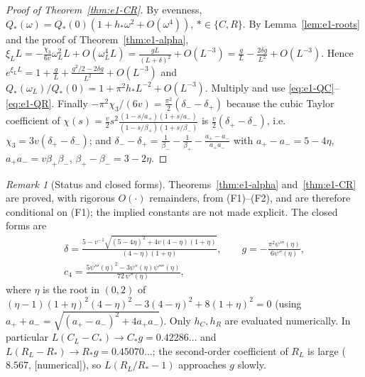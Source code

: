 \documentclass[11pt,a4paper]{article}
\theoremstyle{definition}
\theoremstyle{remark}
\newtheorem{remark}[theorem]{Remark}
\newcommand{\1}{\mathbf 1}
\newcommand{\status}[1]{\textsf{[#1]}}
\begin{document}
\begin{proof}[Proof of Theorem~\ref{thm:e1-CR}]
By evenness, $Q_\ast(\omega)=Q_\ast(0)(1+h_\ast\omega^2+O(\omega^4))$, $\ast\in\{C,R\}$. By
Lemma~\ref{lem:e1-roots} and the proof of Theorem~\ref{thm:e1-alpha},
$\xi_LL=-\frac{\chi_3}{6v}\omega_L^2L+O(\omega_L^4L)=\frac{gL}{(L+\delta)^2}+O(L^{-3})
=\frac gL-\frac{2\delta g}{L^2}+O(L^{-3})$. Hence
$e^{\xi_LL}=1+\frac gL+\frac{g^2/2-2\delta g}{L^2}+O(L^{-3})$ and
$Q_\ast(\omega_L)/Q_\ast(0)=1+\pi^2h_\ast L^{-2}+O(L^{-3})$. Multiply and use
\eqref{eq:e1-QC}--\eqref{eq:e1-QR}. Finally
$-\pi^2\chi_3/(6v)=\frac{\pi^2}2(\delta_--\delta_+)$ because the cubic Taylor coefficient of
$\chi(s)=\frac v2s^2\frac{(1-s/a_+)(1+s/a_-)}{(1-s/\beta_+)(1+s/\beta_-)}$ is
$\frac v2(\delta_+-\delta_-)$, i.e.\ $\chi_3=3v(\delta_+-\delta_-)$; and
$\delta_--\delta_+=\frac1{\beta_-}-\frac1{\beta_+}-\frac{a_+-a_-}{a_+a_-}$ with $a_+-a_-=5-4\eta$,
$a_+a_-=v\beta_+\beta_-$, $\beta_+-\beta_-=3-2\eta$.
\end{proof}

\begin{remark}[Status and closed forms]
Theorems~\ref{thm:e1-alpha} and~\ref{thm:e1-CR} are proved, with rigorous $O(\cdot)$
remainders, from (F1)--(F2), and are therefore conditional on (F1); the implied constants are not made explicit. The
closed forms are
\begin{gather*}
\delta=\frac{5-v^{-1}\sqrt{(5-4\eta)^2+4v(4-\eta)(1+\eta)}}{(4-\eta)(1+\eta)},\qquad
g=-\frac{\pi^2\psi'''(\eta)}{6\psi''(\eta)},\\ c_4=\frac{5\psi'''(\eta)^2-3\psi''(\eta)\psi''''(\eta)}{72\,\psi''(\eta)},
\end{gather*}
where $\eta$ is the root in $(0,2)$ of $(\eta-1)(1+\eta)^2(4-\eta)^2-3(4-\eta)^2+8(1+\eta)^2=0$
(using $a_++a_-=\sqrt{(a_+-a_-)^2+4a_+a_-}$). Only $h_C,h_R$ are evaluated numerically.
In particular $L(C_L-C_*)\to C_*g=0.42286\ldots$ and $L(R_L-R_*)\to R_*g=0.45070\ldots$; the second-order coefficient of $R_L$ is large ($8.567$, \status{numerical}), so $L(R_L/R_*-1)$ approaches $g$ slowly.
\end{remark}
\end{document}
